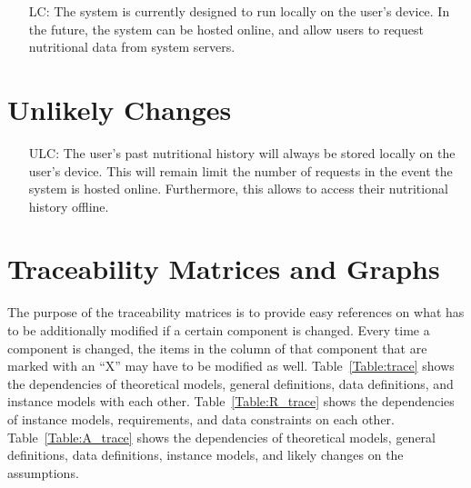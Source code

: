 \documentclass[12pt]{article}
\newcounter{lcnum} %
\newcounter{ulcnum} %
\begin{document}
{\begin{itemize}
\item[LC\refstepcounter{lcnum}\thelcnum\label{LC_meaningfulLabel}:] 
The system is currently designed to run locally on the user's device. In the 
future, the system can be hosted online, and allow users to request nutritional 
data from system servers.

\end{itemize}

\section{Unlikely Changes}    

\noindent \begin{itemize}

\item[ULC\refstepcounter{ulcnum}\theulcnum\label{ULC_meaningfulLabel}:] 
The user's past nutritional history will always be stored locally on the user's 
device. This will remain limit the number of requests in the event the system 
is hosted online. Furthermore, this allows to access their nutritional history 
offline.

\end{itemize}

\section{Traceability Matrices and Graphs}

The purpose of the traceability matrices is to provide easy references on what
has to be additionally modified if a certain component is changed.  Every time a
component is changed, the items in the column of that component that are marked
with an ``X'' may have to be modified as well.  Table~\ref{Table:trace} shows the
dependencies of theoretical models, general definitions, data definitions, and
instance models with each other. Table~\ref{Table:R_trace} shows the
dependencies of instance models, requirements, and data constraints on each
other. Table~\ref{Table:A_trace} shows the dependencies of theoretical models,
general definitions, data definitions, instance models, and likely changes on
the assumptions.



}
\end{document}
